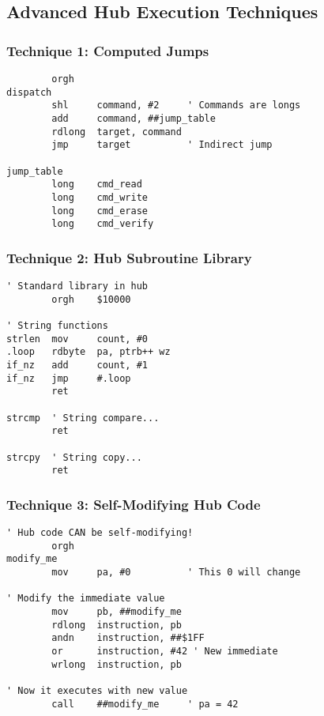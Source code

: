 \documentclass[11pt]{book}
\begin{document}
\hypertarget{advanced-hub-execution-techniques}{%
\subsection{Advanced Hub Execution
Techniques}\label{advanced-hub-execution-techniques}}

\hypertarget{technique-1-computed-jumps}{%
\subsubsection{Technique 1: Computed
Jumps}\label{technique-1-computed-jumps}}

\begin{lstlisting}
        orgh
dispatch
        shl     command, #2     ' Commands are longs
        add     command, ##jump_table
        rdlong  target, command
        jmp     target          ' Indirect jump
        
jump_table
        long    cmd_read
        long    cmd_write
        long    cmd_erase
        long    cmd_verify
\end{lstlisting}

\hypertarget{technique-2-hub-subroutine-library}{%
\subsubsection{Technique 2: Hub Subroutine
Library}\label{technique-2-hub-subroutine-library}}

\begin{lstlisting}
' Standard library in hub
        orgh    $10000
        
' String functions
strlen  mov     count, #0
.loop   rdbyte  pa, ptrb++ wz
if_nz   add     count, #1
if_nz   jmp     #.loop
        ret
        
strcmp  ' String compare...
        ret
        
strcpy  ' String copy...
        ret
\end{lstlisting}

\hypertarget{technique-3-self-modifying-hub-code}{%
\subsubsection{Technique 3: Self-Modifying Hub
Code}\label{technique-3-self-modifying-hub-code}}

\begin{lstlisting}
' Hub code CAN be self-modifying!
        orgh
modify_me
        mov     pa, #0          ' This 0 will change
        
' Modify the immediate value
        mov     pb, ##modify_me
        rdlong  instruction, pb
        andn    instruction, ##$1FF
        or      instruction, #42 ' New immediate
        wrlong  instruction, pb
        
' Now it executes with new value
        call    ##modify_me     ' pa = 42
\end{lstlisting}
\end{document}
